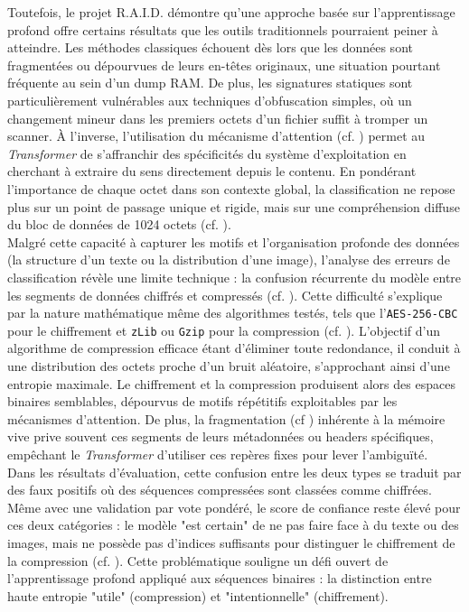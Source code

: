 \documentclass[12pt]{report}
\begin{document}
    Toutefois, le projet R.A.I.D. démontre qu'une approche basée sur l'apprentissage profond offre certains résultats que les outils traditionnels pourraient peiner à atteindre. Les méthodes classiques échouent dès lors que les données sont fragmentées ou dépourvues de leurs en-têtes originaux, une situation pourtant fréquente au sein d'un dump RAM. De plus, les signatures statiques sont particulièrement vulnérables aux techniques d'obfuscation simples, où un changement mineur dans les premiers octets d'un fichier suffit à tromper un scanner. À l'inverse, l'utilisation du mécanisme d'attention (cf. ) permet au \textit{Transformer} de s'affranchir des spécificités du système d'exploitation en cherchant à extraire du sens directement depuis le contenu. En pondérant l'importance de chaque octet dans son contexte global, la classification ne repose plus sur un point de passage unique et rigide, mais sur une compréhension diffuse du bloc de données de 1024 octets (cf. ).\\

    Malgré cette capacité à capturer les motifs et l'organisation profonde des données (la structure d'un texte ou la distribution d'une image), l'analyse des erreurs de classification révèle une limite technique : la confusion récurrente du modèle entre les segments de données chiffrés et compressés (cf. ). Cette difficulté s'explique par la nature mathématique même des algorithmes testés, tels que l'\texttt{AES-256-CBC} pour le chiffrement et \texttt{zLib} ou \texttt{Gzip} pour la compression (cf. ). L'objectif d'un algorithme de compression efficace étant d'éliminer toute redondance, il conduit à une distribution des octets proche d'un bruit aléatoire, s'approchant ainsi d'une entropie maximale. Le chiffrement et la compression produisent alors des espaces binaires semblables, dépourvus de motifs répétitifs exploitables par les mécanismes d'attention. De plus, la fragmentation (cf ) inhérente à la mémoire vive prive souvent ces segments de leurs métadonnées ou headers spécifiques, empêchant le \textit{Transformer} d'utiliser ces repères fixes pour lever l'ambiguïté.\\

    Dans les résultats d'évaluation, cette confusion entre les deux types se traduit par des faux positifs où des séquences compressées sont classées comme chiffrées. Même avec une validation par vote pondéré, le score de confiance reste élevé pour ces deux catégories : le modèle "est certain" de ne pas faire face à du texte ou des images, mais ne possède pas d'indices suffisants pour distinguer le chiffrement de la compression (cf. ). Cette problématique souligne un défi ouvert de l'apprentissage profond appliqué aux séquences binaires : la distinction entre haute entropie "utile" (compression) et "intentionnelle" (chiffrement).\\
\end{document}
